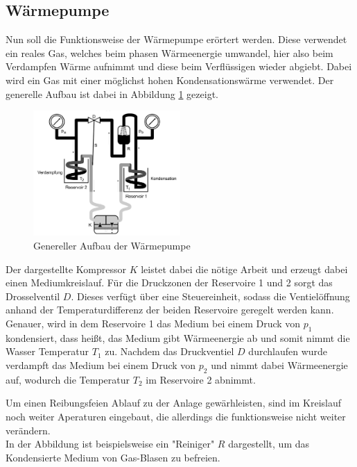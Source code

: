 \subsection*{Wärmepumpe}
Nun soll die Funktionsweise der Wärmepumpe erörtert werden.
Diese verwendet ein reales Gas, welches beim phasen Wärmeenergie umwandel, hier also beim Verdampfen Wärme 
aufnimmt und diese beim Verflüssigen wieder abgiebt.
Dabei wird ein Gas mit einer möglichst hohen Kondensationswärme verwendet.
Der generelle Aufbau ist dabei in Abbildung \ref{fig:aufbau_generell} gezeigt.
\begin{figure}[H]
    \centering
    \includegraphics[width=0.5\textwidth]{bilder/aufbau_generell.jpg}
    \caption{Genereller Aufbau der Wärmepumpe \cite[196]{Anleitung}}
    \label{fig:aufbau_generell}
\end{figure}
Der dargestellte Kompressor $K$ leistet dabei die nötige Arbeit und 
erzeugt dabei einen Mediumkreislauf. Für die Druckzonen
der Reservoire 1 und 2 sorgt das Drosselventil $D$.
Dieses verfügt über eine Steuereinheit, sodass die Ventielöffnung
anhand der Temperaturdifferenz der beiden Reservoire geregelt werden kann.\\

Genauer, wird in dem Reservoire 1 das Medium bei einem Druck von $p_1$ kondensiert, dass heißt, das Medium gibt Wärmeenergie
ab und somit nimmt die Wasser Temperatur $T_1$ zu.
Nachdem das Druckventiel $D$ durchlaufen wurde verdampft das Medium bei einem Druck von $p_2$ und nimmt dabei Wärmeenergie auf,
wodurch die Temperatur $T_2$ im Reservoire 2 abnimmt.

Um einen Reibungsfeien Ablauf zu der Anlage gewärhleisten, sind
im Kreislauf noch weiter Aperaturen eingebaut, die allerdings die funktionsweise
nicht weiter verändern.\\
In der Abbildung ist beispielsweise ein "Reiniger" $R$ dargestellt, um 
das Kondensierte Medium von Gas-Blasen zu befreien.  


